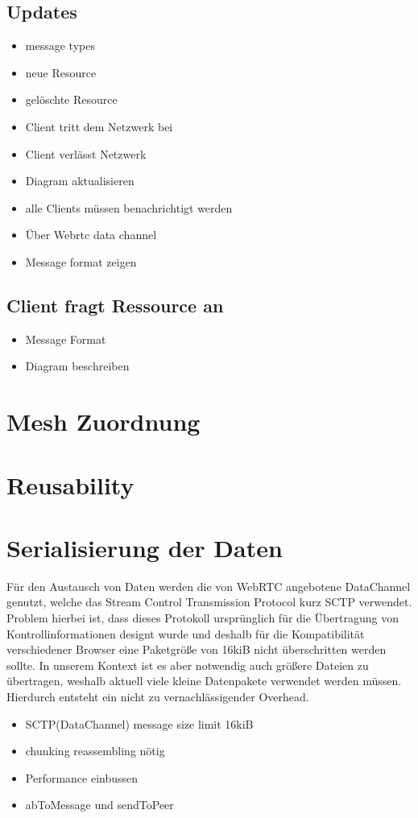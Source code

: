 \subsection{Updates}
\begin{itemize}
	\item message types
	\item neue Resource
	\item gelöschte Resource
	\item Client tritt dem Netzwerk bei
	\item Client verlässt Netzwerk
	\item Diagram aktualisieren
	\item alle Clients müssen benachrichtigt werden
	\item Über Webrtc data channel
	\item Message format zeigen
\end{itemize}
\subsection{Client fragt Ressource an}
\begin{itemize}
	\item Message Format
	\item Diagram beschreiben
\end{itemize}
\section{Mesh Zuordnung}

\section{Reusability}

\section{Serialisierung der Daten}
Für den Austausch von Daten werden die von WebRTC angebotene DataChannel genutzt, welche das Stream Control Transmission Protocol kurz SCTP verwendet. Problem hierbei ist, dass dieses Protokoll ursprünglich für die Übertragung von Kontrollinformationen designt wurde und deshalb für die Kompatibilität verschiedener Browser eine Paketgröße von 16kiB nicht überschritten werden sollte. In unserem Kontext ist es aber notwendig auch größere Dateien zu übertragen, weshalb aktuell viele kleine Datenpakete verwendet werden müssen. Hierdurch entsteht ein nicht zu vernachlässigender Overhead.
\begin{itemize}
  \item SCTP(DataChannel) message size limit 16kiB
  \item chunking reassembling nötig
  \item Performance einbussen
  \item abToMessage und sendToPeer
\end{itemize}

